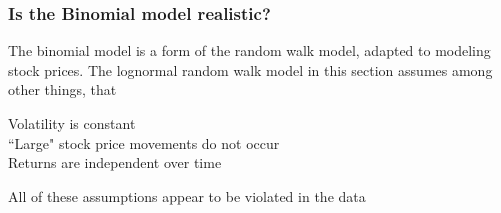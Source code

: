 \begin{frame}[fragile]
	\frametitle{Is the Binomial model realistic?}
	\begin{center}

	The binomial model is a form of the random walk model, adapted to modeling stock prices. The lognormal random walk model in this section assumes among other things, that
	\bigskip

	Volatility is constant\\[0.5em]

	``Large" stock price movements do not occur \\[0.5em]

	Returns are independent over time\\[0.5em]

	\bigskip
	\mySeparateLine
	\bigskip

	All of these assumptions appear to be violated in the data

	\end{center}
\end{frame}
